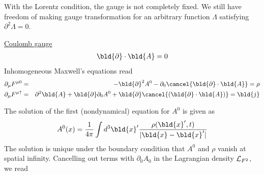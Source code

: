 With the Lorentz condition, the gauge is not completely fixed. We still have freedom of
making gauge transformation for an arbitrary function $\Lambda$ satisfying 
$\partial^2 \Lambda = 0$.

\bigskip
\noindent
\underline{Coulomb gauge}\\
\begin{eqnarray}
\bld{\partial} \cdot \bld{A} = 0
\label{eqn:CoulmbGaugeCond}
\end{eqnarray}
Inhomogeneous Maxwell's equations read
\begin{eqnarray}
\partial_\mu F^{\mu 0} 
&=&
- \bld{\partial}^2 A^0 - \partial_0 
\cancel{
\bld{\partial}\cdot \bld{A}
}
= \rho
\label{eqn:CoulmbEOMrho}
\\
\partial_\mu F^{\mu \uparrow} 
&=&
\partial^2 \bld{A} + \bld{\partial}\partial_0 A^0 +
\bld{\partial}
\cancel{
 (\bld{\partial}\cdot \bld{A})
}
= \bld{j}
\label{eqn:CoulmbEOMj}
\end{eqnarray}
\begin{comment}
\begin{eqnarray}
\left\{
\begin{array}{l}
\partial_\mu F^{\mu 0} =
- \bld{\partial}^2 A^0 - \partial_0 
\cancel{
\bld{\partial}\cdot \bld{A}
}
= \rho
\\
\partial_\mu F^{\mu \uparrow} =
\partial^2 \bld{A} + \bld{\partial}\partial_0 A^0 +
\bld{\partial}
\cancel{
 (\bld{\partial}\cdot \bld{A})
}
= \bld{j}
\end{array}
\right.
\label{eqn:CoulmbEOMj}
\end{eqnarray}
\end{comment}
The solution of the first (nondynamical) equation for $A^0$ is given as
\begin{eqnarray}
A^0 (x) = \frac{1}{4\pi} \int d^3 \bld{x}' 
\frac{\rho(\bld{x}', t)}{| \bld{x} - \bld{x}' |}
\label{eqn:CoulmbA0}
\end{eqnarray}
The solution is unique under the boundary condition that $A^0$ and $\rho$ vanish at
spatial infinity.
Cancelling out terms with $\partial_0 A_0$ in the Lagrangian density ${\cal L}_{F^2}$,  
we read
